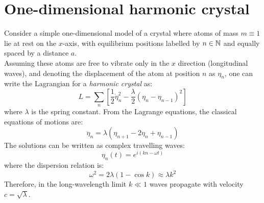 
\section{One-dimensional harmonic crystal}

Consider a simple one-dimensional model of a crystal where atoms of mass $ m \equiv 1 $ lie at rest on the $ x $-axis, with equilibrium positions labelled by $ n \in \mathbb{N} $ and equally spaced by a distance $ a $.\\
Assuming these atoms are free to vibrate only in the $ x $ direction (longitudinal waves), and denoting the displacement of the atom at position $ n $ as $ \eta_n $, one can write the Lagrangian for a \textit{harmonic crystal} as:
\begin{equation}
  L = \sum_{n} \left[ \frac{1}{2} \dot{\eta}_n^2 - \frac{\lambda}{2} \left( \eta_n - \eta_{n-1} \right)^2 \right]
  \label{eq:1.1}
\end{equation}
where $ \lambda $ is the spring constant. From the Lagrange equations, the classical equations of motions are:
\begin{equation}
  \ddot{\eta}_n = \lambda \left( \eta_{n+1} - 2 \eta_n + \eta_{n-1} \right)
  \label{eq:1.2}
\end{equation}
The solutions can be written as complex travelling waves:
\begin{equation}
  \eta_n (t) = e^{i \left( k n - \omega t \right)}
  \label{eq:1.3}
\end{equation}
where the dispersion relation is:
\begin{equation}
  \omega^2 = 2\lambda \left( 1 - \cos k \right) \approx \lambda k^2
  \label{eq:1.4}
\end{equation}
Therefore, in the long-wavelength limit $ k \ll 1 $ waves propagate with velocity $ c = \sqrt{\lambda} $.
